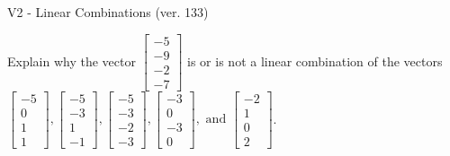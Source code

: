 \begin{exercise}
  \begin{exerciseTitle}V2 - Linear Combinations (ver. 133)\end{exerciseTitle}
  \begin{exerciseStatement}
    Explain why the vector \(\left[\begin{array}{c}
-5 \\
-9 \\
-2 \\
-7
\end{array}\right]\)  is or is not a linear 
	combination of the vectors \(\left[\begin{array}{c}
-5 \\
0 \\
1 \\
1
\end{array}\right] , \left[\begin{array}{c}
-5 \\
-3 \\
1 \\
-1
\end{array}\right] , \left[\begin{array}{c}
-5 \\
-3 \\
-2 \\
-3
\end{array}\right] , \left[\begin{array}{c}
-3 \\
0 \\
-3 \\
0
\end{array}\right] , \text{ and } \left[\begin{array}{c}
-2 \\
1 \\
0 \\
2
\end{array}\right]\).
	



\end{exerciseStatement}
\end{exercise}

